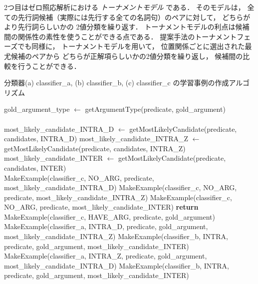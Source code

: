 \documentclass[japanese]{jnlp_1.4}
\begin{document}
2つ目はゼロ照応解析における
\emph{トーナメントモデル} \cite{Iida:2004:IPSJ}である．
そのモデルは，
全ての先行詞候補（実際には先行する全ての名詞句）のペアに対して，
どちらがより先行詞らしいかの
2値分類を繰り返す．
トーナメントモデルの利点は候補間の関係性の素性を使うことができる点である．
提案手法のトーナメントフェーズでも同様に，
トーナメントモデルを用いて，
位置関係ごとに選出された最尤候補のペアから
どちらが正解項らしいかの2値分類を繰り返し，
候補間の比較を行うことができる．



\begin{algorithm}[p]
\caption{分類器(a) classifier\_a, (b) classifier\_b, (c) classifier\_c の学習事例の作成アルゴリズム}\label{alg:train}
\begin{algorithmic}
\State gold\_argument\_type $\leftarrow$ getArgumentType(predicate, gold\_argument)\\
\\
\State {}
\State most\_likely\_candidate\_INTRA\_D $\leftarrow$ getMostLikelyCandidate(predicate, candidates, INTRA\_D)
\State most\_likely\_candidate\_INTRA\_Z $\leftarrow$ getMostLikelyCandidate(predicate, candidates, INTRA\_Z)
\State most\_likely\_candidate\_INTER $\leftarrow$ getMostLikelyCandidate(predicate, candidates, INTER)
\\
	\State MakeExample(classifier\_c, NO\_ARG, predicate, most\_likely\_candidate\_INTRA\_D)
	\State MakeExample(classifier\_c, NO\_ARG, predicate, most\_likely\_candidate\_INTRA\_Z)
	\State MakeExample(classifier\_c, NO\_ARG, predicate, most\_likely\_candidate\_INTER)
	\State \textbf{return}
\EndIf
\\
\State MakeExample(classifier\_c, HAVE\_ARG, predicate, gold\_argument)
	\State MakeExample(classifier\_a, INTRA\_D, predicate, gold\_argument, \\
		\hspace*{88pt}most\_likely\_candidate\_INTRA\_Z)
	\State MakeExample(classifier\_b, INTRA, predicate, gold\_argument, most\_likely\_candidate\_INTER)
	\State MakeExample(classifier\_a, INTRA\_Z, predicate, gold\_argument, \\
		\hspace*{88pt}most\_likely\_candidate\_INTRA\_D)
	\State MakeExample(classifier\_b, INTRA, predicate, gold\_argument, most\_likely\_candidate\_INTER)

\end{algorithmic}
\end{algorithm}
\end{document}
